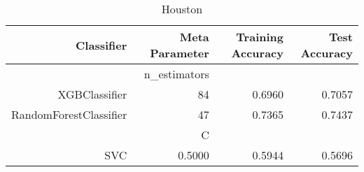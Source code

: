 
\begin{table}[H]
    \caption{Houston}
    \centering
    \begin{tabular}{|r|r|r|r|}
        \hline
        Classifier &Meta Parameter &Training Accuracy
        &Test Accuracy\\
        \hline
        &n\_estimators &\multicolumn{2}{|r|}{}\\
        \hline
        XGBClassifier &84 &0.6960 &0.7057\\
        \hline
        RandomForestClassifier &47 &0.7365 &0.7437\\
        \hline
        &C &\multicolumn{2}{|r|}{}\\
        \hline
        SVC &0.5000 &0.5944 &0.5696\\
        \hline
    \end{tabular}
\end{table}
